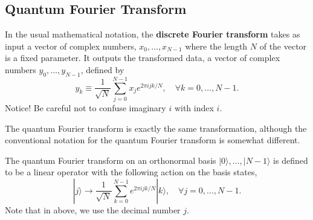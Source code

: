 


\subsection{Quantum Fourier Transform}

In the usual mathematical notation, the \textbf{discrete Fourier transform} takes as input a vector of complex numbers, $x_{0}, \ldots, x_{N-1}$ where the length $N$ of the vector is a fixed parameter. It outputs the transformed data, a vector of complex numbers $y_{0}, \ldots, y_{N-1}$, defined by
\begin{equation}
    y_{k} \equiv \frac{1}{\sqrt{N}} \sum_{j=0}^{N-1} x_{j} e^{2 \pi i j k / N}, \quad \forall k = 0,\dots,N-1.
\tag{5.1}
\end{equation}
Notice! Be careful not to confuse imaginary $i$ with index $i$.

The quantum Fourier transform is exactly the same transformation, although the conventional notation for the quantum Fourier transform is somewhat different. 

\begin{definition}
    The quantum Fourier transform on an orthonormal basis $|0\rangle, \ldots,|N-1\rangle$ is defined to be a linear operator with the following action on the basis states,
\begin{equation}
    |j\rangle \longrightarrow \frac{1}{\sqrt{N}} \sum_{k=0}^{N-1} e^{2 \pi i j k / N}|k\rangle, \quad \forall j = 0,\dots,N-1. \tag{5.2}
\end{equation}
Note that in above, we use the decimal number $j$.
\end{definition}

